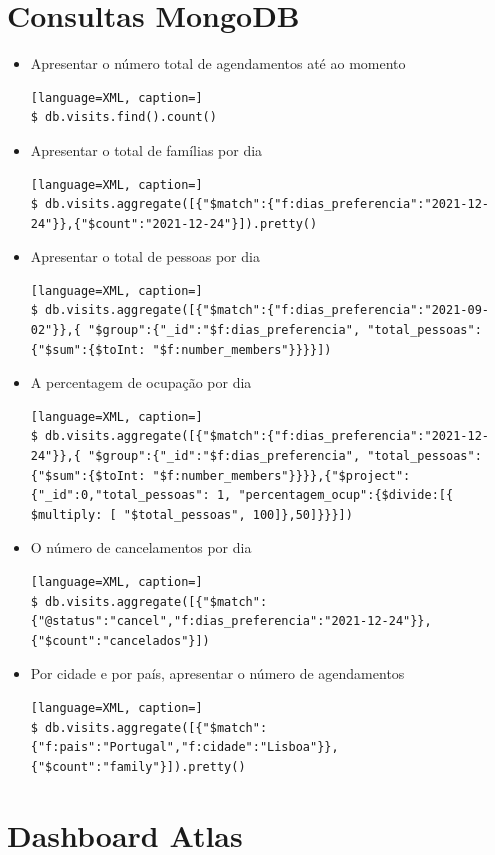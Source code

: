 \documentclass{article}
\begin{document}
\section{Consultas MongoDB}

\begin{itemize}
    \item Apresentar o número total de agendamentos até ao momento
\begin{lstlisting}[language=XML, caption=]
$ db.visits.find().count()
\end{lstlisting}
    \item Apresentar o total de famílias por dia
\begin{lstlisting}[language=XML, caption=]
$ db.visits.aggregate([{"$match":{"f:dias_preferencia":"2021-12-24"}},{"$count":"2021-12-24"}]).pretty() 
\end{lstlisting}
    \item Apresentar o total de pessoas por dia
\begin{lstlisting}[language=XML, caption=]
$ db.visits.aggregate([{"$match":{"f:dias_preferencia":"2021-09-02"}},{ "$group":{"_id":"$f:dias_preferencia", "total_pessoas":{"$sum":{$toInt: "$f:number_members"}}}}])
\end{lstlisting}
    \item A percentagem de ocupação por dia
\begin{lstlisting}[language=XML, caption=]
$ db.visits.aggregate([{"$match":{"f:dias_preferencia":"2021-12-24"}},{ "$group":{"_id":"$f:dias_preferencia", "total_pessoas":{"$sum":{$toInt: "$f:number_members"}}}},{"$project":{"_id":0,"total_pessoas": 1, "percentagem_ocup":{$divide:[{ $multiply: [ "$total_pessoas", 100]},50]}}}])
\end{lstlisting}
    \item O número de cancelamentos por dia
\begin{lstlisting}[language=XML, caption=]
$ db.visits.aggregate([{"$match":{"@status":"cancel","f:dias_preferencia":"2021-12-24"}},{"$count":"cancelados"}])
\end{lstlisting}
    \item Por cidade e por país, apresentar o número de agendamentos
\begin{lstlisting}[language=XML, caption=]
$ db.visits.aggregate([{"$match":{"f:pais":"Portugal","f:cidade":"Lisboa"}},{"$count":"family"}]).pretty()
\end{lstlisting}
\end{itemize}

\section{Dashboard Atlas}
\end{document}
